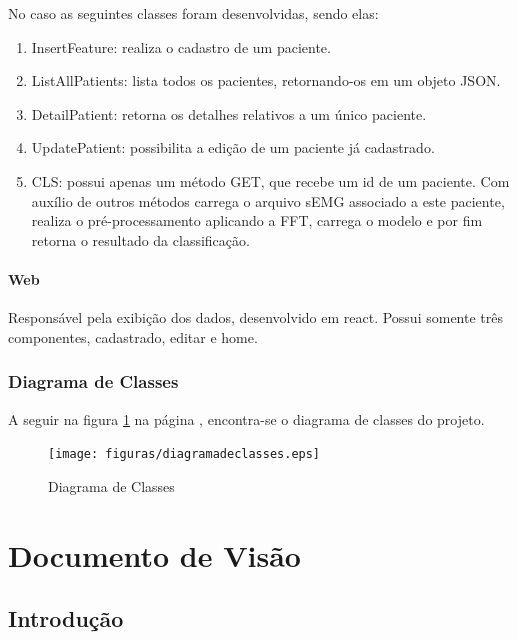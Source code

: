 \begin{anexosenv}
    No caso as seguintes classes foram desenvolvidas, sendo elas:
    \begin{enumerate}
        \item InsertFeature: realiza o cadastro de um paciente.
        \item ListAllPatients: lista todos os pacientes, retornando-os em um objeto JSON.
        \item DetailPatient: retorna os detalhes relativos a um único paciente.
        \item UpdatePatient: possibilita a edição de um paciente já cadastrado.
        \item CLS: possui apenas um método GET, que recebe um id de um paciente. Com auxílio de outros métodos carrega o arquivo sEMG associado a este paciente, realiza o pré-processamento aplicando a FFT, carrega o modelo e por fim retorna o resultado da classificação.
    \end{enumerate}

    \subsubsection{Web}
    Responsável pela exibição dos dados, desenvolvido em react. Possui somente três componentes, cadastrado, editar e home.

   \subsection{Diagrama de Classes}
   A seguir na figura \ref{diagramadeclasses} na página \pageref{diagramadeclasses}, encontra-se o diagrama de classes do projeto.
   \begin{figure}[!htb]
        \centering
        \texttt{[image: figuras/diagramadeclasses.eps]}
        \caption{Diagrama de Classes}
        \label{diagramadeclasses}
   \end{figure}
  
  

    \chapter[Documento de Visão]{Documento de Visão}
    \label{adocvisao}

    \section{Introdução}


\end{anexosenv}
